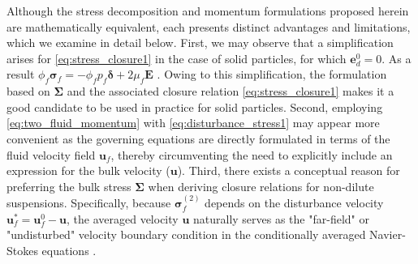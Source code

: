 Although the stress decomposition and momentum formulations proposed herein are mathematically equivalent, each presents distinct advantages and limitations, which we examine in detail below.
First, we may observe that a simplification arises for \ref{eq:stress_closure1} in the case of solid particles, for which $\textbf{e}_d^0 = 0$.
As a result $\phi _f \bm \sigma _f = - \phi _f p_f \bm\delta + 2 \mu_ f \textbf{E}$ \citep{joseph1990ensemble,jackson2000}. %
Owing to this simplification, the formulation based on $\bm\Sigma$ and the associated closure relation \eqref{eq:stress_closure1} makes it a good candidate to be used in practice for solid particles. %
Second, employing \ref{eq:two_fluid_momentum} with \ref{eq:disturbance_stress1} may appear more convenient as the governing equations are directly formulated in terms of the fluid velocity field $\textbf{u}_f$, thereby circumventing the need to explicitly include an expression for the bulk velocity ($\textbf{u}$). %
Third, there exists a conceptual reason for preferring the bulk stress $\bm\Sigma$ when deriving closure relations for non-dilute suspensions.  %
Specifically, because $\bm\sigma_f^{(2)}$ depends on the disturbance velocity $\textbf{u}_f^* = \textbf{u}_f^0 - \textbf{u}$, the averaged velocity $\textbf{u}$ naturally serves as the "far-field" or "undisturbed" velocity boundary condition in the conditionally averaged Navier-Stokes equations \citep{hinch1977averaged,fintzi2025}. %

